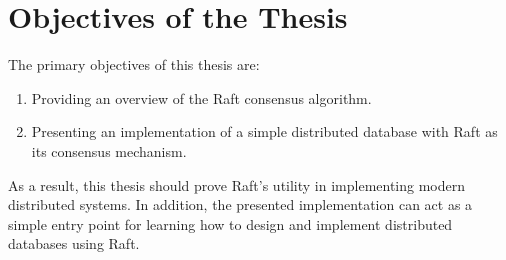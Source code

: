 \section{Objectives of the Thesis}

The primary objectives of this thesis are:
\begin{enumerate}
  \item Providing an overview of the Raft consensus algorithm.
  \item Presenting an implementation of a simple distributed database with Raft as its consensus mechanism.
\end{enumerate}

As a result, this thesis should prove Raft's utility in implementing modern distributed systems. In addition, the presented implementation can act as a simple entry point for learning how to design and implement distributed databases using Raft.